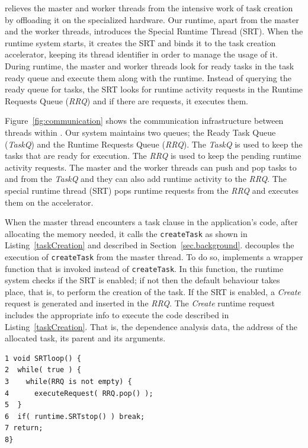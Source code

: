 {\proposal} relieves the master and worker threads from the intensive work of task creation by offloading it on the specialized hardware.
Our runtime, apart from the master and the worker threads, introduces the Special Runtime Thread (SRT). 
When the runtime system starts, it creates the SRT and binds it to the task creation accelerator, keeping its thread identifier in order to manage the usage of it.
During runtime, the master and worker threads look for ready tasks in the task ready queue and execute them along with the runtime.
Instead of querying the ready queue for tasks, the SRT looks for runtime activity requests in the Runtime Requests Queue (\textit{RRQ}) and if there are requests, it executes them.

Figure~\ref{fig:communication} shows the communication infrastructure between threads within {\proposal}.
Our system maintains two queues; the Ready Task Queue (\textit{TaskQ}) and the Runtime Requests Queue (\textit{RRQ}).
The \textit{TaskQ} is used to keep the tasks that are ready for execution. 
The \textit{RRQ} is used to keep the pending runtime activity requests. 
The master and the worker threads can push and pop tasks to and from the \textit{TaskQ} and they can also add runtime activity to the \textit{RRQ}. 
The special runtime thread (SRT) pops runtime requests from the \textit{RRQ} and executes them on the accelerator.

When the master thread encounters a task clause in the application's code, after allocating the memory needed, it calls the \texttt{createTask} as shown in Listing~\ref{taskCreation} and described in Section~\ref{sec.background}. 
{\proposal} decouples the execution of \texttt{createTask} from the master thread. 
To do so, {\proposal} implements a wrapper function that is invoked instead of \texttt{createTask}.
In this function, the runtime system checks if the SRT is enabled; if not then the default behaviour takes place, that is, to perform the creation of the task.
If the SRT is enabled, a \textit{Create} request is generated and inserted in the \textit{RRQ}.
The \textit{Create} runtime request includes the appropriate info to execute the code described in Listing~\ref{taskCreation}.
That is, the dependence analysis data, the address of the allocated task, its parent and its arguments.


\begin{lstlisting}[float, emph={void,if,return,non_critical_queue, critical_queue,not,true,and,break}, captionpos=b, caption={Pseudo-code for the SRT loop.},label=SRTloop, emph={[2]mat}, emphstyle={[2]}, aboveskip={0\baselineskip}, frame=tb, belowskip={0\baselineskip}]
1 void SRTloop() {
2  while( true ) {   
3    while(RRQ is not empty) {
4      executeRequest( RRQ.pop() );
5  }
6  if( runtime.SRTstop() ) break;
7 return; 
8}  
\end{lstlisting}

